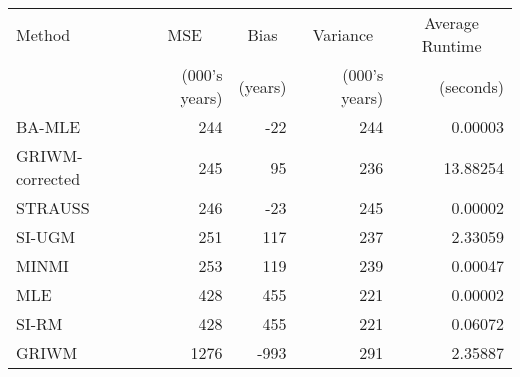 
\begin{tabular}{lrrrr}
\toprule
\multicolumn{1}{l}{Method} & \multicolumn{1}{c}{MSE} & \multicolumn{1}{c}{Bias} & \multicolumn{1}{c}{Variance} & \multicolumn{1}{c}{Average Runtime} \\
 & (000's years) & (years) & (000's years) & (seconds)\\
\midrule
BA-MLE & 244 & -22 & 244 & 0.00003\\
GRIWM-corrected & 245 & 95 & 236 & 13.88254\\
STRAUSS & 246 & -23 & 245 & 0.00002\\
SI-UGM & 251 & 117 & 237 & 2.33059\\
MINMI & 253 & 119 & 239 & 0.00047\\
\addlinespace
MLE & 428 & 455 & 221 & 0.00002\\
SI-RM & 428 & 455 & 221 & 0.06072\\
GRIWM & 1276 & -993 & 291 & 2.35887\\
\bottomrule
\end{tabular}
